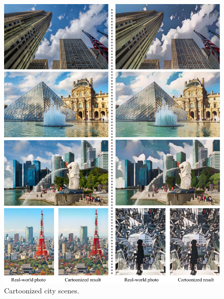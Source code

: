 \documentclass[10pt,twocolumn,letterpaper]{article}
\begin{document}
\begin{figure}[b]
\vspace{-0.5em}
\centering
\includegraphics[width=\linewidth]{figures/city2.pdf}
\caption{Cartoonized city scenes.}
\label{fig:city2}
\end{figure}
\end{document}
